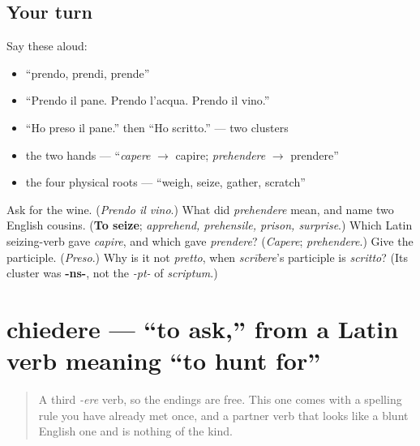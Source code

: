 \subsection*{Your turn}
Say these aloud:

\begin{itemize}
\raggedright
  \item \textquotedblleft{}prendo, prendi, prende\textquotedblright{}
  \item \textquotedblleft{}Prendo il pane. Prendo l'acqua. Prendo il vino.\textquotedblright{}
  \item \textquotedblleft{}Ho preso il pane.\textquotedblright{} then \textquotedblleft{}Ho scritto.\textquotedblright{} — two clusters
  \item the two hands — \textquotedblleft{}\emph{capere} $\to$ capire; \emph{prehendere} $\to$ prendere\textquotedblright{}
  \item the four physical roots — \textquotedblleft{}weigh, seize, gather, scratch\textquotedblright{}
\end{itemize}

\begin{tcolorbox}[breakable,colback=teal!4,colframe=teal!35!black,title={Before you move on}]
Ask for the wine. (\emph{Prendo il vino}.) What did \emph{prehendere} mean, and name two English cousins. (\textbf{To seize}; \emph{apprehend, prehensile, prison, surprise}.) Which Latin seizing-verb gave \emph{capire}, and which gave \emph{prendere}? (\emph{Capere}; \emph{prehendere}.) Give the participle. (\emph{Preso}.) Why is it not \emph{pretto}, when \emph{scrībere}'s participle is \emph{scritto}? (Its cluster was \textbf{-ns-}, not the \emph{-pt-} of \emph{scriptum}.)
\end{tcolorbox}
\section[chiedere]{chiedere — \textquotedblleft{}to ask,\textquotedblright{} from a Latin verb meaning \textquotedblleft{}to hunt for\textquotedblright{}}

\label{lesson:IT-C19-chiedere}



\begin{quote}
A third \emph{-ere} verb, so the endings are free. This one comes with a spelling rule you have already met once, and a partner verb that looks like a blunt English one and is nothing of the kind.
\end{quote}

